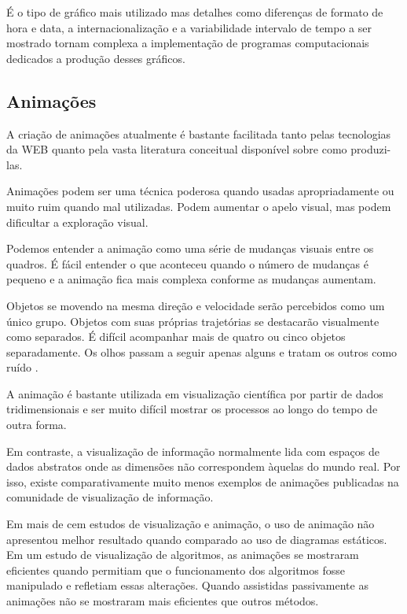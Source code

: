 \documentclass[]{article}
\begin{document}
É o tipo de gráfico mais utilizado mas detalhes como diferenças de formato de hora e data, a internacionalização e a variabilidade intervalo de tempo a ser mostrado tornam complexa a implementação de programas computacionais dedicados a produção desses gráficos. \cite{tufte1983visual}

\subsection{Animações}

A criação de animações atualmente é bastante facilitada tanto pelas tecnologias da WEB quanto pela vasta literatura conceitual disponível sobre como produzi-las.

Animações podem ser uma técnica poderosa quando usadas apropriadamente ou muito ruim quando mal utilizadas. Podem aumentar o apelo visual, mas podem dificultar a exploração visual.

Podemos entender a animação como uma série de mudanças visuais entre os quadros. É fácil entender o que aconteceu quando o número de mudanças é pequeno e a animação fica mais complexa conforme as mudanças aumentam.

Objetos se movendo na mesma direção e velocidade serão percebidos como um único grupo. Objetos com suas próprias trajetórias se destacarão visualmente como separados. É difícil acompanhar mais de quatro ou cinco objetos separadamente. Os olhos passam a seguir apenas alguns e tratam os outros como ruído \cite{Cavanagh2005349}.

A animação é bastante utilizada em visualização científica por partir de dados tridimensionais e ser muito difícil mostrar os processos ao longo do tempo de outra forma.

Em contraste, a visualização de informação normalmente lida com espaços de dados abstratos onde as dimensões não correspondem àquelas do mundo real. Por isso, existe comparativamente muito menos exemplos de animações publicadas na comunidade de visualização de informação.

Em mais de cem estudos de visualização e animação, o uso de animação não apresentou melhor resultado quando comparado ao uso de diagramas estáticos. Em um estudo de visualização de algoritmos, as animações se mostraram eficientes quando permitiam que o funcionamento dos algoritmos fosse manipulado e refletiam essas alterações. Quando assistidas passivamente as animações não se mostraram mais eficientes que outros métodos. \cite{steele2010beautiful}
\end{document}
